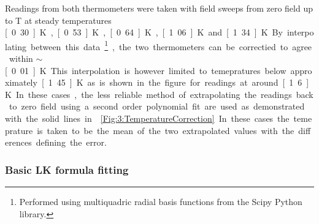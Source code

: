 Readings from both thermometers were taken with field sweeps from zero field up to \unit[18]{T} at steady temperatures \unit[0.30]{K}, \unit[0.53]{K}, \unit[0.64]{K}, \unit[1.06]{K} and \unit[1.34]{K}. By interpolating between this data\footnote{Performed using multiquadric radial basis functions from the Scipy Python library.}, the two thermometers can be correctied to agree within $\sim$\unit[0.01]{K}. This interpolation is however limited to temepratures below approximately \unit[1.45]{K} as is shown in the figure for readings at around \unit[1.6]{K}. In these cases, the less reliable method of extrapolating the readings back to zero field using a second order polynomial fit are used as demonstrated with the solid lines in \fig\ref{Fig:3:TemperatureCorrection}. In these cases the temeprature is taken to be the mean of the two extrapolated values with the differences defining the error.

\subsubsection{Basic LK formula fitting}

